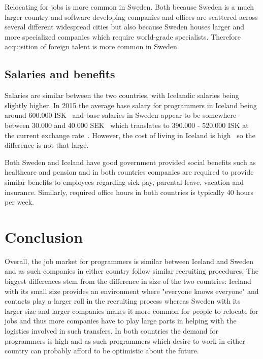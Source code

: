Relocating for jobs is more common in Sweden. Both because Sweden is a much larger country and software developing companies and offices are scattered across several different widespread cities but also because Sweden houses larger and more specialized companies which require world-grade specialists. Therefore acquisition of foreign talent is more common in Sweden.

\section{Salaries and benefits}
Salaries are similar between the two countries, with Icelandic salaries being slightly higher. In 2015 the average base salary for programmers in Iceland being around 600.000 ISK~\cite{VR} and base salaries in Sweden appear to be somewhere between 30.000\cite{lon1} and 40.000 SEK~\cite{lon2} which translates to 390.000 - 520.000 ISK at the current exchange rate~\cite{arion}. However, the cost of living in Iceland is high~\cite{grapevine} so the difference is not that large.

Both Sweden and Iceland have good government provided social benefits such as healthcare and pension and in both countries companies are required to provide similar benefits to employees regarding sick pay, parental leave, vacation and insurance. Similarly, required office hours in both countries is typically 40 hours per week.

\chapter{Conclusion}
Overall, the job market for programmers is similar between Iceland and Sweden and as such companies in either country follow similar recruiting procedures. The biggest differences stem from the difference in size of the two countries: Iceland with its small size provides an environment where "everyone knows everyone" and contacts play a larger roll in the recruiting process whereas Sweden with its larger size and larger companies makes it more common for people to relocate for jobs and thus more companies have to play large parts in helping with the logistics involved in such transfers. In both countries the demand for programmers is high and as such programmers which desire to work in either country can probably afford to be optimistic about the future.
